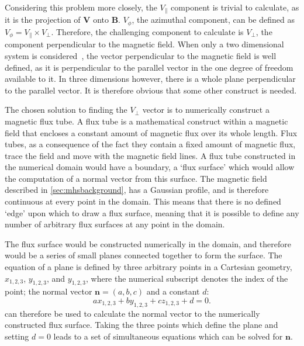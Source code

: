 \documentclass[a4paper,12pt,fourier,authoryear,custommargin]{Classes/PhDThesisPSnPDF}
\renewcommand{\vec}{\mathbf}
\begin{document}
Considering this problem more closely, the $V_\parallel$ component is trivial to calculate, as it is the projection of $\vec{V}$ onto $\vec{B}$.
$V_\phi$, the azimuthal component, can be defined as $V_\phi = V_\parallel \times V_\perp$.
Therefore, the challenging component to calculate is $V_\perp$, the component perpendicular to the magnetic field.
When only a two dimensional system is considered~\citep[e.g.][]{bogdan2003,fedun2011,shelyag2012}, the vector perpendicular to the magnetic field is well defined, as it is perpendicular to the parallel vector in the one degree of freedom available to it.
In three dimensions however, there is a whole plane perpendicular to the parallel vector.
It is therefore obvious that some other construct is needed.

The chosen solution to finding the $V_\perp$ vector is to numerically construct a magnetic flux tube.
A flux tube is a mathematical construct within a magnetic field that encloses a constant amount of magnetic flux over its whole length.
Flux tubes, as a consequence of the fact they contain a fixed amount of magnetic flux, trace the field and move with the magnetic field lines.
A flux tube constructed in the numerical domain would have a boundary, a `flux surface' which would allow the computation of a normal vector from this surface.
The magnetic field described in \cref{sec:mhsbackground}, has a Gaussian profile, and is therefore continuous at every point in the domain.
This means that there is no defined `edge' upon which to draw a flux surface, meaning that it is possible to define any number of arbitrary flux surfaces at any point in the domain.



The flux surface would be constructed numerically in the domain, and therefore would be a series of small planes connected together to form the surface.
The equation of a plane is defined by three arbitrary points in a Cartesian geometry, $x_{1,2,3}$, $y_{1,2,3}$, and $y_{1,2,3}$, where the numerical subscript denotes the index of the point; the normal vector $\vec{n}=(a,b,c)$ and a constant $d$:
\begin{equation}
    ax_{1,2,3}+by_{1,2,3}+cz_{1,2,3}+d=0.
    \label{eq:plane}
\end{equation}
 can therefore be used to calculate the normal vector to the numerically constructed flux surface.
Taking the three points which define the plane and setting $d=0$ leads to a set of simultaneous equations which can be solved for $\vec{n}$.
\end{document}
